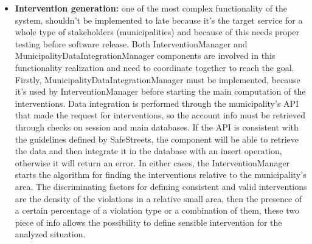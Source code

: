 \begin{itemize}
	\item \textbf{Intervention generation:} one of the most complex functionality of the system, shouldn't be implemented to late because it's the target service for a whole type of stakeholders (municipalities) and because of this needs proper testing before software release. Both InterventionManager and MunicipalityDataIntegrationManager components are involved in this functionality realization and need to coordinate together to reach the goal. Firstly, MunicipalityDataIntegrationManager must be implemented, because it's used by InterventionManager before starting the main computation of the interventions. Data integration is performed through the municipality's API that made the request for interventions, so the account info must be retrieved through checks on session and main databases. If the API is consistent with the guidelines defined by SafeStreets, the component will be able to retrieve the data and then integrate it in the database with an insert operation, otherwise it will return an error. In either cases, the InterventionManager starts the algorithm for finding the interventions relative to the municipality's area. The discriminating factors for defining consistent and valid interventions are the density of the violations in a relative small area, then the presence of a certain percentage of a violation type or a combination of them, these two piece of info allows the possibility to define sensible intervention for the analyzed situation.  
\end{itemize}